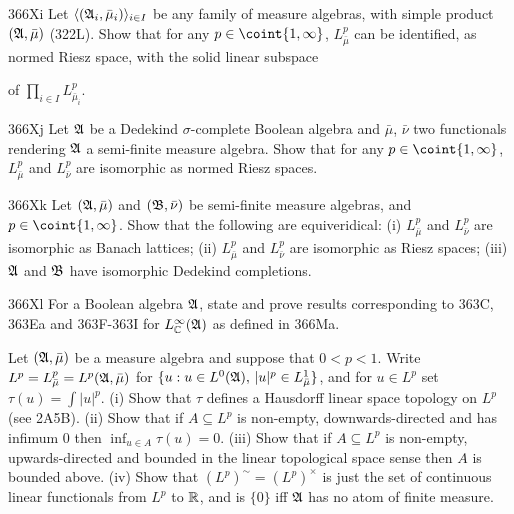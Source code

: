 {\spheader 366Xi Let $\langle(\frak A_i,\bar\mu_i)\rangle_{i\in I}$ be
any family of measure algebras, with simple product $(\frak A,\bar\mu)$
(322L).   Show that for any $p\in\coint{1,\infty}$,
$L^p_{\bar\mu}$ can be
identified, as normed Riesz space, with the solid linear subspace


\noindent of $\prod_{i\in I}L^p_{\bar\mu_i}$.

\spheader 366Xj Let $\frak A$ be a Dedekind $\sigma$-complete Boolean
algebra and $\bar\mu$, $\bar\nu$ two functionals rendering $\frak A$ a
semi-finite measure algebra.   Show that for any $p\in\coint{1,\infty}$,
$L^p_{\bar\mu}$ and $L^p_{\bar\nu}$ are isomorphic as
normed Riesz spaces.   

\spheader 366Xk Let $(\frak A,\bar\mu)$ and $(\frak B,\bar\nu)$ be
semi-finite measure
algebras, and $p\in\coint{1,\infty}$.   Show that the following are
equiveridical:  (i) $L^p_{\bar\mu}$ and $L^p_{\bar\nu}$ are isomorphic
as
Banach lattices;  (ii) $L^p_{\bar\mu}$ and $L^p_{\bar\nu}$ are
isomorphic as
Riesz spaces;  (iii) $\frak A$ and $\frak B$ have isomorphic Dedekind
completions.

\spheader 366Xl
For a Boolean algebra $\frak A$, state and prove
results corresponding to 363C, 363Ea and 363F-363I %
for $L^{\infty}_{\Bbb C}(\frak A)$ as defined in 366Ma.

Let $(\frak A,\bar\mu)$ be a measure algebra and suppose that $0<p<1$.
Write $L^p=L^p_{\bar\mu}=L^p(\frak A,\bar\mu)$ for
$\{u:u\in L^0(\frak A),\,|u|^p\in L^1_{\bar\mu}\}$, and for
$u\in L^p$ set $\tau(u)=\int|u|^p$.
(i) Show that $\tau$ defines a Hausdorff linear space topology on $L^p$
(see 2A5B).
(ii) Show that if $A\subseteq L^p$ is non-empty, downwards-directed and
has infimum $0$ then $\inf_{u\in A}\tau(u)=0$.   (iii) Show that if
$A\subseteq L^p$ is non-empty, upwards-directed and bounded in the
linear topological space sense then $A$ is bounded above.
(iv) Show that $(L^p)^{\sim}=(L^p)^{\times}$ is just the set of
continuous linear functionals from $L^p$ to $\Bbb R$, and is $\{0\}$ iff
$\frak A$ has no atom of finite measure.

}
